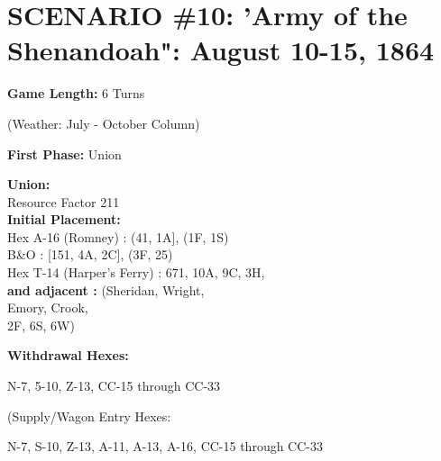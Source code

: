 \section{SCENARIO \#10: 'Army of the Shenandoah": August 10-15, 1864
}


\begin{scenariodata}
\textbf{Game Length:} 6 Turns\\
\end{scenariodata}

\begin{scenariodata}
(Weather: July - October Column)\\
\end{scenariodata}

\begin{scenariodata}
\textbf{First Phase:} Union\\
\end{scenariodata}

\begin{scenariodata}
\textbf{Union:}\\
Resource Factor 211\\
\textbf{Initial Placement:}\\
Hex A-16 (Romney) : (41, 1A], (1F, 1S)\\
B\&O : [151, 4A, 2C], (3F, 25)\\
Hex T-14 (Harper's Ferry) : 671, 10A, 9C, 3H,\\
\textbf{and adjacent :} (Sheridan, Wright,\\
Emory, Crook,\\
2F, 6S, 6W)\\
\end{scenariodata}

\begin{scenariodata}
\textbf{Withdrawal Hexes:}\\
\end{scenariodata}

\begin{scenariodata}
N-7, 5-10, Z-13, CC-15 through CC-33\\
\end{scenariodata}

\begin{scenariodata}
(Supply/Wagon Entry Hexes:\\
\end{scenariodata}

\begin{scenariodata}
N-7, S-10, Z-13, A-11, A-13, A-16, CC-15 through CC-33\\
\end{scenariodata}

